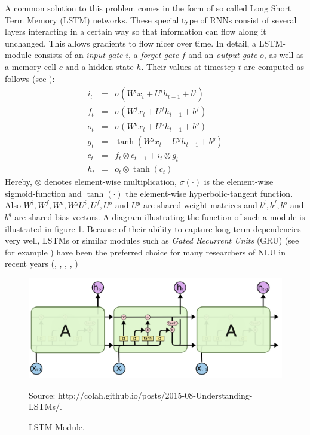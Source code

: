 \documentclass[twoside,11pt,a4paper]{article}
\theoremstyle{break}
\begin{document}
A common solution to this problem comes in the form of so called Long Short Term Memory (LSTM) networks. These special type of RNNs consist of several layers interacting in a certain way so that information can flow along it unchanged. This allows gradients to flow nicer over time. In detail, a LSTM-module consists of an \textit{input-gate} $i$, a  \textit{forget-gate} $f$ and an \textit{output-gate} $o$, as well as a memory cell $c$ and a hidden state $h$. Their values at timestep $t$ are computed as follows (see \cite{zhai:2017}):
\begin{eqnarray*}
	i_t	&=&	\sigma(W^i x_t + U^i h_{t-1} + b^i)\\
	f_t	&=&	\sigma(W^f x_t + U^f h_{t-1} + b^f)\\
	o_t	&=&	\sigma(W^o x_t + U^o h_{t-1} + b^o)\\
	g_t &=& \tanh(W^g x_t + U^g h_{t-1} + b^g)\\
	c_t &=&	f_t \otimes c_{t-1} + i_t \otimes g_t\\
	h_t &=& o_t \otimes \tanh(c_t)
\end{eqnarray*}
Hereby, $\otimes$ denotes element-wise multiplication, $\sigma(\cdot)$ is the element-wise sigmoid-function and $\tanh(\cdot)$ the element-wise hyperbolic-tangent function. Also $W^i, W^f, W^o, W^g U^i, U^f, U^o$ and  $U^g$ are shared weight-matrices and $b^i, b^f, b^o$ and $b^g$ are shared bias-vectors.
A diagram illustrating the function of such a module is illustrated in figure \ref{fig:lstm}. Because of their ability to capture long-term dependencies very well, LSTMs or similar modules such as \textit{Gated Recurrent Units} (GRU) (see for example \cite{zhang:2016}) have been the preferred choice for many researchers of NLU in recent years (\cite{kurata:2016}, \cite{ravuri:2015}, \cite{yang:2016}, \cite{zhai:2017}, \cite{zhang:2016})

\begin{figure}[H]
	\begin{center}
		\includegraphics[width = 14cm]{lstm.png}
		\caption{LSTM-Module.}
		Source: http://colah.github.io/posts/2015-08-Understanding-LSTMs/.
		\label{fig:lstm}
	\end{center}
\end{figure}
\end{document}
